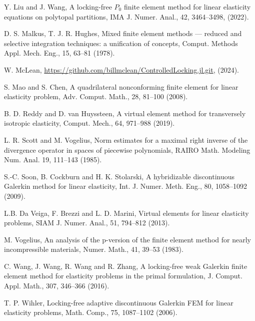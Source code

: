 \documentclass[11pt]{article}
\numberwithin{equation}{section}
\begin{document}
\begin{thebibliography}{99.}
 Y. Liu and  J. Wang, A locking-free $P_0$ finite element method for linear elasticity equations on polytopal partitions, IMA J. Numer. Anal., 42, 3464--3498, (2022).

 D. S. Malkus, T. J. R. Hughes, Mixed finite element methods — reduced and selective integration techniques: a unification of concepts, Comput. Methods Appl. Mech. Eng., 15, 63--81 (1978).

 W. McLean,  \url{https://github.com/billmclean/ControlledLocking.jl.git}, (2024).

 S. Mao and  S. Chen, A quadrilateral nonconforming finite element for linear elasticity problem, Adv. Comput. Math., 28, 81--100 (2008).

 B. D. Reddy and  D. van Huyssteen, A virtual element method for transversely isotropic elasticity, Comput. Mech., 64, 971--988 (2019).

 L. R. Scott and M. Vogelius, Norm estimates for a maximal right inverse of the divergence operator in spaces of piecewise polynomials, RAIRO Math. Modeling Num. Anal. 19, 111--143 (1985).

 S.-C. Soon, B. Cockburn and H. K. Stolarski, A hybridizable discontinuous Galerkin method for linear elasticity, Int. J. Numer. Meth.  Eng., 80, 1058--1092 (2009).


 L.B. Da Veiga, F. Brezzi and  L. D. Marini, Virtual elements for linear elasticity problems, SIAM J. Numer. Anal., 51, 794--812 (2013).

 M. Vogelius, An analysis of the p-version of the finite element method for nearly incompressible materials, Numer. Math., 41, 39--53 (1983).

 C. Wang, J. Wang, R. Wang and  R. Zhang, A locking-free weak Galerkin finite element method for elasticity problems in the primal formulation, J. Comput. Appl. Math., 307, 346--366 (2016).

 T. P. Wihler, Locking-free adaptive discontinuous Galerkin FEM for linear elasticity problems, Math. Comp.,  75, 1087--1102 (2006).


\end{thebibliography}
\end{document}
